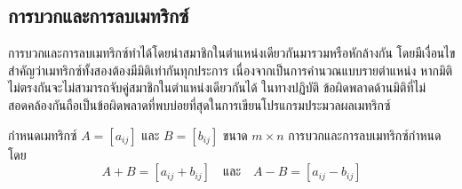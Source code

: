 \subsection{การบวกและการลบเมทริกซ์}
\label{ssec:matrix-add-sub}
การบวกและการลบเมทริกซ์ทำได้โดยนำสมาชิกในตำแหน่งเดียวกันมารวมหรือหักล้างกัน โดยมีเงื่อนไขสำคัญว่าเมทริกซ์ทั้งสองต้องมีมิติเท่ากันทุกประการ เนื่องจากเป็นการคำนวณแบบรายตำแหน่ง หากมิติไม่ตรงกันจะไม่สามารถจับคู่สมาชิกในตำแหน่งเดียวกันได้ ในทางปฏิบัติ ข้อผิดพลาดด้านมิติที่ไม่สอดคล้องกันถือเป็นข้อผิดพลาดที่พบบ่อยที่สุดในการเขียนโปรแกรมประมวลผลเมทริกซ์~\parencite{anton2019linear}

\begin{definition}[การบวกและการลบเมทริกซ์]
กำหนดเมทริกซ์ $A = [a_{ij}]$ และ $B = [b_{ij}]$ ขนาด $m \times n$ การบวกและการลบเมทริกซ์กำหนดโดย
\[ A + B = [a_{ij} + b_{ij}] \quad\text{และ}\quad A - B = [a_{ij} - b_{ij}] \]
\end{definition}

